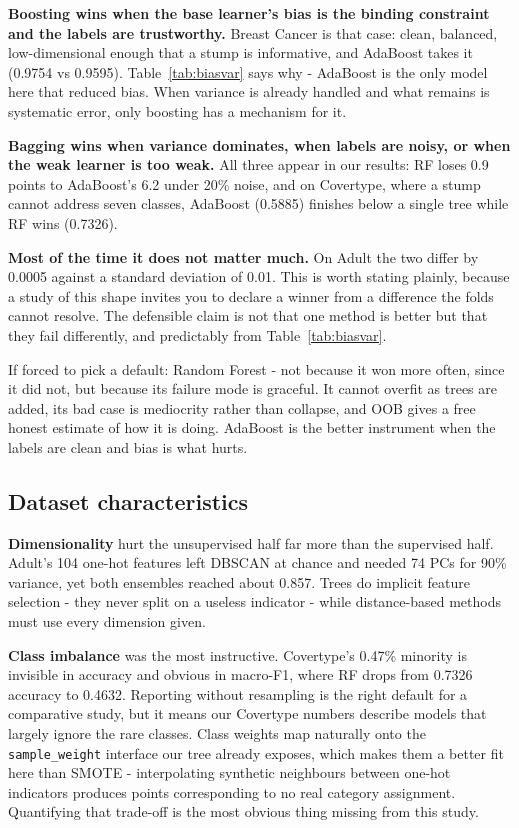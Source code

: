 \documentclass[conference]{IEEEtran}
\begin{document}
\textbf{Boosting wins when the base learner's bias is the binding
constraint and the labels are trustworthy.}  Breast Cancer is that case:
clean, balanced, low-dimensional enough that a stump is informative, and
AdaBoost takes it (0.9754 vs 0.9595).  Table~\ref{tab:biasvar} says why -
AdaBoost is the only model here that reduced bias.  When variance is
already handled and what remains is systematic error, only boosting has a
mechanism for it.

\textbf{Bagging wins when variance dominates, when labels are noisy, or
when the weak learner is too weak.}  All three appear in our results: RF
loses 0.9 points to AdaBoost's 6.2 under 20\% noise, and on Covertype,
where a stump cannot address seven classes, AdaBoost (0.5885) finishes
below a single tree while RF wins (0.7326).

\textbf{Most of the time it does not matter much.}  On Adult the two differ
by 0.0005 against a standard deviation of 0.01.  This is worth stating
plainly, because a study of this shape invites you to declare a winner from
a difference the folds cannot resolve.  The defensible claim is not that
one method is better but that they fail differently, and predictably from
Table~\ref{tab:biasvar}.

If forced to pick a default: Random Forest - not because it won more
often, since it did not, but because its failure mode is graceful.  It
cannot overfit as trees are added, its bad case is mediocrity rather than
collapse, and OOB gives a free honest estimate of how it is doing.
AdaBoost is the better instrument when the labels are clean and bias is
what hurts.

\subsection{Dataset characteristics}
\textbf{Dimensionality} hurt the unsupervised half far more than the
supervised half.  Adult's 104 one-hot features left DBSCAN at chance and
needed 74 PCs for 90\% variance, yet both ensembles reached about 0.857.
Trees do implicit feature selection - they never split on a useless
indicator - while distance-based methods must use every dimension given.

\textbf{Class imbalance} was the most instructive.  Covertype's 0.47\%
minority is invisible in accuracy and obvious in macro-F1, where RF drops
from 0.7326 accuracy to 0.4632.  Reporting without resampling is the right
default for a comparative study, but it means our Covertype numbers
describe models that largely ignore the rare classes.  Class weights map
naturally onto the \texttt{sample\_weight} interface our tree already
exposes, which makes them a better fit here than SMOTE - interpolating
synthetic neighbours between one-hot indicators produces points
corresponding to no real category assignment.  Quantifying that trade-off
is the most obvious thing missing from this study.
\end{document}

